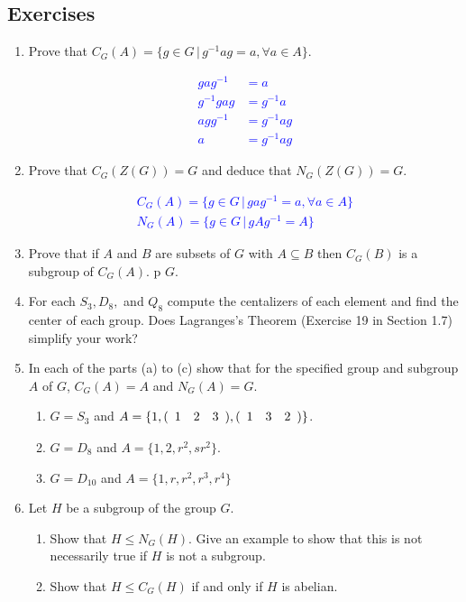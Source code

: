 \documentclass[10pt,a4paper]{report}
\newcommand{\BLUE}[1]{\textcolor{blue}{#1}}
\begin{document}
\subsection{Exercises}
\begin{enumerate}

\item Prove that $C_G(A) = \{g \in G \,|\,g^{-1}ag=a, \forall a \in A\}$.

\BLUE{
\begin{align*}
	gag^{-1} &= a\\
	g^{-1}gag &= g^{-1}a\\
	agg^{-1}&=g^{-1}ag\\
	a&=g^{-1}ag
\end{align*}
}

\item Prove that $C_G(Z(G)) = G$ and deduce that $N_G(Z(G))=G$.

\BLUE{
\begin{align*}
	C_G(A)=\{g \in G\,|\,gag^{-1}=a, \forall a \in A\} \\
	N_G(A)=\{g\in G\,|\,gAg^{-1}=A\}
\end{align*}
}

\item Prove that if $A$ and $B$ are subsets of $G$ with $A \subseteq B$ then $C_G(B)$ is a subgroup of $C_G(A)$.
p $G$.

\item For each $S_3, D_8, $ and $Q_8$ compute the centalizers of each element and find the center of each group.  Does Lagranges's Theorem (Exercise 19 in Section 1.7) simplify your work?

\item In each of the parts (a) to (c) show that for the specified group and subgroup $A$ of $G$, $C_G(A)=A$ and $N_G(A)=G$.
\begin{enumerate}
	\item $G=S_3$ and $A=\{1, (\begin{array}{cccccccccc} 1&2&3 \end{array}), (\begin{array}{cccccccccc} 1&3&2 \end{array})\}$.
	\item $G=D_8$ and $A=\{1,2,r^2,sr^2\}$.
	\item $G=D_{10}$ and $A=\{1,r,r^2,r^3, r^4\}$
\end{enumerate}

\item Let $H$ be a subgroup of the group $G$.
\begin{enumerate}
	\item Show that $H \le N_G(H)$.  Give an example to show that this is not necessarily true if $H$ is not a subgroup.
	\item Show that $H \le C_G(H)$ if and only if $H$ is abelian.
\end{enumerate}


\end{enumerate}
\end{document}
